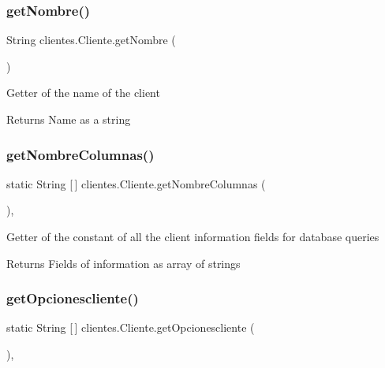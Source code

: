 \subsubsection{\texorpdfstring{get\+Nombre()}{getNombre()}}
{\footnotesize\ttfamily String clientes.\+Cliente.\+get\+Nombre (\begin{DoxyParamCaption}{ }\end{DoxyParamCaption})\hspace{0.3cm}{\ttfamily [inline]}}

Getter of the name of the client

\begin{DoxyReturn}{Returns}
Name as a string 
\end{DoxyReturn}
\mbox{\label{classclientes_1_1_cliente_aaedfb1a4a28af84fb0e22c75d0d9dfdd}} 
\subsubsection{\texorpdfstring{get\+Nombre\+Columnas()}{getNombreColumnas()}}
{\footnotesize\ttfamily static String \mbox{[}$\,$\mbox{]} clientes.\+Cliente.\+get\+Nombre\+Columnas (\begin{DoxyParamCaption}{ }\end{DoxyParamCaption})\hspace{0.3cm}{\ttfamily [inline]}, {\ttfamily [static]}}

Getter of the constant of all the client information fields for database queries

\begin{DoxyReturn}{Returns}
Fields of information as array of strings 
\end{DoxyReturn}
\mbox{\label{classclientes_1_1_cliente_ac66c36eb54668f7dead734827d61f75e}} 
\subsubsection{\texorpdfstring{get\+Opcionescliente()}{getOpcionescliente()}}
{\footnotesize\ttfamily static String \mbox{[}$\,$\mbox{]} clientes.\+Cliente.\+get\+Opcionescliente (\begin{DoxyParamCaption}{ }\end{DoxyParamCaption})\hspace{0.3cm}{\ttfamily [inline]}, {\ttfamily [static]}}

